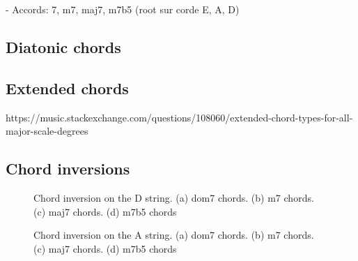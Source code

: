 \documentclass{article}
\begin{document}


- Accords: 7, m7, maj7, m7b5 (root sur corde E, A, D)


\clearpage
\subsection{Diatonic chords}




\subsection{Extended chords}

https://music.stackexchange.com/questions/108060/extended-chord-types-for-all-major-scale-degrees

\clearpage
\subsection{Chord inversions}

\begin{figure}[h!]
	\centering
	\hspace*{-2.2cm}
	\scalebox{0.7}{}
	\hspace*{-2.2cm}
	\scalebox{0.7}{}
	\hspace*{-2.2cm}
	\scalebox{0.7}{}
	\hspace*{-2.2cm}
	\scalebox{0.7}{}
	\caption{Chord inversion on the D string. (a) dom7 chords. (b) m7 chords. (c) maj7 chords. (d) m7b5 chords }
	\label{fig}
\end{figure}

\begin{figure}[h!]
	\centering
	\hspace*{-2.2cm}
	\scalebox{0.7}{}
	\hspace*{-2.2cm}
	\hspace*{-2.2cm}
	\hspace*{-2.2cm}
	\caption{Chord inversion on the A string. (a) dom7 chords. (b) m7 chords. (c) maj7 chords. (d) m7b5 chords }
	\label{fig}
\end{figure}
\end{document}
